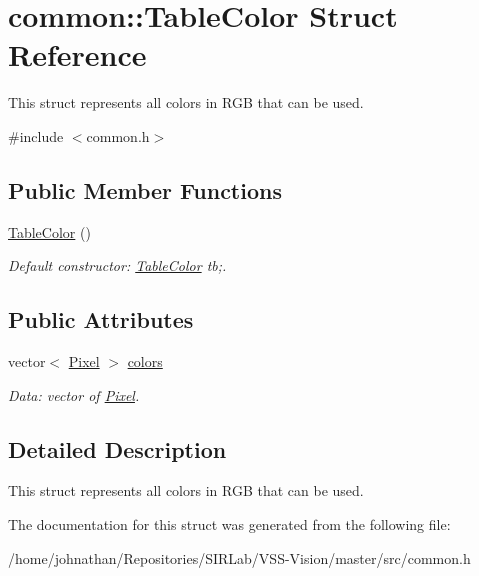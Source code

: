 \hypertarget{structcommon_1_1TableColor}{}\section{common\+:\+:Table\+Color Struct Reference}
\label{structcommon_1_1TableColor}


This struct represents all colors in R\+GB that can be used.  




{\ttfamily \#include $<$common.\+h$>$}

\subsection*{Public Member Functions}
\begin{DoxyCompactItemize}
\item 
\hyperlink{structcommon_1_1TableColor_a08d8a7adc0b6462e2f78843dfd2e9b49}{Table\+Color} ()\hypertarget{structcommon_1_1TableColor_a08d8a7adc0b6462e2f78843dfd2e9b49}{}\label{structcommon_1_1TableColor_a08d8a7adc0b6462e2f78843dfd2e9b49}

\begin{DoxyCompactList}\small\item\em Default constructor\+: \hyperlink{structcommon_1_1TableColor}{Table\+Color} tb;. \end{DoxyCompactList}\end{DoxyCompactItemize}
\subsection*{Public Attributes}
\begin{DoxyCompactItemize}
\item 
vector$<$ \hyperlink{structcommon_1_1Pixel}{Pixel} $>$ \hyperlink{structcommon_1_1TableColor_a8ce253b484c9054445fcd4b3adc4726d}{colors}\hypertarget{structcommon_1_1TableColor_a8ce253b484c9054445fcd4b3adc4726d}{}\label{structcommon_1_1TableColor_a8ce253b484c9054445fcd4b3adc4726d}

\begin{DoxyCompactList}\small\item\em Data\+: vector of \hyperlink{structcommon_1_1Pixel}{Pixel}. \end{DoxyCompactList}\end{DoxyCompactItemize}


\subsection{Detailed Description}
This struct represents all colors in R\+GB that can be used. 

The documentation for this struct was generated from the following file\+:\begin{DoxyCompactItemize}
\item 
/home/johnathan/\+Repositories/\+S\+I\+R\+Lab/\+V\+S\+S-\/\+Vision/master/src/common.\+h\end{DoxyCompactItemize}
